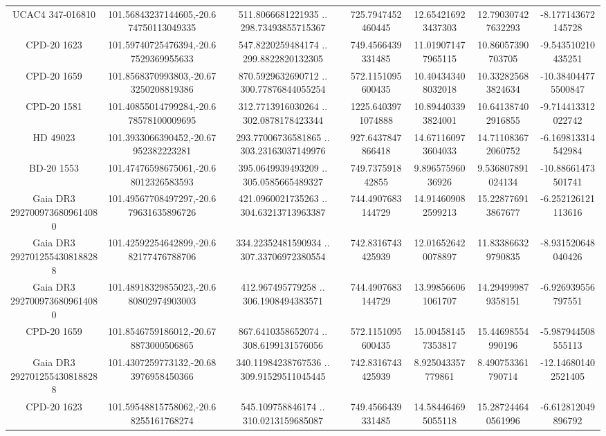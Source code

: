 \begin{table}
\begin{tabular}{ccccccc}
UCAC4 347-016810 & 101.56843237144605,-20.674750113049335 & 511.8066681221935 .. 298.73493855715367 & 725.7947452460445 & 12.654216923437303 & 12.790307427632293 & -8.177143672145728 \\
CPD-20  1623 & 101.59740725476394,-20.67529369955633 & 547.8220259484174 .. 299.8822820132305 & 749.4566439331485 & 11.019071477965115 & 10.86057390703705 & -9.543510210435251 \\
CPD-20  1659 & 101.8568370993803,-20.673250208819386 & 870.5929632690712 .. 300.77876844055254 & 572.1151095600435 & 10.404343408032018 & 10.332825683824634 & -10.384044775500847 \\
CPD-20  1581 & 101.40855014799284,-20.678578100009695 & 312.7713916030264 .. 302.0878178423344 & 1225.6403971074888 & 10.894403393824001 & 10.641387402916855 & -9.714413312022742 \\
HD  49023 & 101.3933066390452,-20.67952382223281 & 293.77006736581865 .. 303.23163037149976 & 927.6437847866418 & 14.671160973604033 & 14.711083672060752 & -6.169813314542984 \\
BD-20  1553 & 101.47476598675061,-20.68012326583593 & 395.0649939493209 .. 305.0585665489327 & 749.737591842855 & 9.89657596036926 & 9.536807891024134 & -10.88661473501741 \\
Gaia DR3 2927009736809614080 & 101.49567708497297,-20.679631635896726 & 421.0960021735263 .. 304.63213713963387 & 744.4907683144729 & 14.914609082599213 & 15.228776913867677 & -6.252126121113616 \\
Gaia DR3 2927012554308188288 & 101.42592254642899,-20.682177476788706 & 334.22352481590934 .. 307.33706972380554 & 742.8316743425939 & 12.016526420078897 & 11.833866329790835 & -8.931520648040426 \\
Gaia DR3 2927009736809614080 & 101.48918329855023,-20.680802974903003 & 412.967495779258 .. 306.1908494383571 & 744.4907683144729 & 13.998566061061707 & 14.294999879358151 & -6.926939556797551 \\
CPD-20  1659 & 101.8546759186012,-20.678873000506865 & 867.6410358652074 .. 308.6199131576056 & 572.1151095600435 & 15.004581457353817 & 15.44698554990196 & -5.987944508555113 \\
Gaia DR3 2927012554308188288 & 101.4307259773132,-20.683976958450366 & 340.11984238767536 .. 309.91529511045445 & 742.8316743425939 & 8.925043357779861 & 8.490753361790714 & -12.146801402521405 \\
CPD-20  1623 & 101.59548815758062,-20.68255161768274 & 545.109758846174 .. 310.0213159685087 & 749.4566439331485 & 14.584464695055118 & 15.287244640561996 & -6.612812049896792 \\

\end{tabular}
\end{table}
